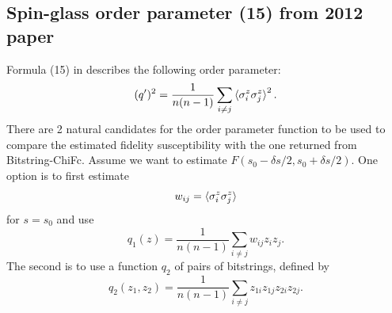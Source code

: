 \documentclass[american,aps,pra,reprint,floatfix,nofootinbib,superscriptaddress]{revtex4-2}
\begin{document}
\subsection{Spin-glass order parameter (15) from 2012 paper}
Formula (15) in \cite{farhi2012performance} describes the following order parameter:
\begin{equation}
  (q')^2 = \frac{1}{n(n-1)}\sum_{i\neq j} \braket{\sigma_i^z\sigma_j^z}^2.
\end{equation}
There are 2 natural candidates for the order parameter function
to be used to compare the estimated fidelity susceptibility with
the one returned from Bitstring-ChiFc. Assume we want to estimate
$F(s_0-\delta s/2, s_0 + \delta s/2)$.
One option is to first estimate
\begin{equation}
  w_{ij} = \braket{\sigma_i^z\sigma_j^z}
\end{equation}
for $s=s_0$ and use
\begin{equation}
  q_1(z) = \frac{1}{n(n-1)}\sum_{i\neq j} w_{ij} z_i z_j.
\end{equation}
The second is to use a function $q_2$ of pairs of bitstrings, defined by
\begin{equation}
  q_2(z_1,z_2) = \frac{1}{n(n-1)}\sum_{i\neq j}z_{1i}z_{1j}z_{2i}z_{2j}.
\end{equation}




\end{document}
